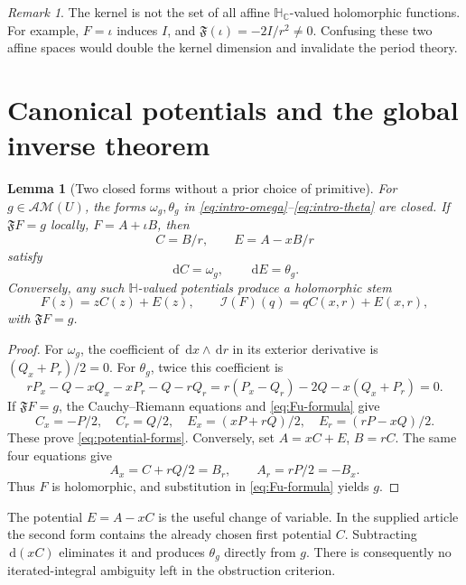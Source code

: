\documentclass[11pt,a4paper]{article}
\numberwithin{equation}{section}
\newtheorem{lemma}[theorem]{Lemma}
\theoremstyle{definition}
\theoremstyle{remark}
\newtheorem{remark}[theorem]{Remark}
\newcommand{\C}{\mathbb C}
\newcommand{\HH}{\mathbb H}
\newcommand{\HC}{\mathbb H_{\C}}
\newcommand{\Ind}{\mathcal I}
\newcommand{\Fu}{\mathfrak F}
\newcommand{\AM}{\mathcal{AM}}
\newcommand{\dd}{\,\mathrm d}
\begin{document}
\begin{remark}
The kernel is not the set of all affine $\HC$-valued holomorphic functions.
For example, $F=\iota$ induces $I$, and $\Fu(\iota)=-2I/r^2\ne0$.
Confusing these two affine spaces would double the kernel dimension and
invalidate the period theory.
\end{remark}

\section{Canonical potentials and the global inverse theorem}
\label{sec:periods}

\begin{lemma}[Two closed forms without a prior choice of primitive]
\label{lem:forms}
For $g\in\AM(U)$, the forms $\omega_g,\theta_g$ in
\eqref{eq:intro-omega}--\eqref{eq:intro-theta} are closed. If
$\Fu F=g$ locally, $F=A+\iota B$, then
\begin{equation}\label{eq:potentials}
 C=B/r,\qquad E=A-xB/r
\end{equation}
satisfy
\begin{equation}\label{eq:potential-forms}
 \dd C=\omega_g,\qquad \dd E=\theta_g.
\end{equation}
Conversely, any such $\HH$-valued potentials produce a holomorphic stem
\begin{equation}\label{eq:reconstruct}
 F(z)=zC(z)+E(z),\qquad \Ind(F)(q)=qC(x,r)+E(x,r),
\end{equation}
with $\Fu F=g$.
\end{lemma}
\begin{proof}
For $\omega_g$, the coefficient of $\dd x\wedge\dd r$ in its exterior
derivative is $(Q_x+P_r)/2=0$. For $\theta_g$, twice this coefficient is
\[
 rP_x-Q-xQ_x-xP_r-Q-rQ_r
 =r(P_x-Q_r)-2Q-x(Q_x+P_r)=0.
\]
If $\Fu F=g$, the Cauchy--Riemann equations and
\eqref{eq:Fu-formula} give
\[
 C_x=-P/2,\quad C_r=Q/2,\quad
 E_x=(xP+rQ)/2,\quad E_r=(rP-xQ)/2.
\]
These prove \eqref{eq:potential-forms}. Conversely, set $A=xC+E$,
$B=rC$. The same four equations give
\[
 A_x=C+rQ/2=B_r,\qquad A_r=rP/2=-B_x.
\]
Thus $F$ is holomorphic, and substitution in \eqref{eq:Fu-formula}
yields $g$.
\end{proof}

The potential $E=A-xC$ is the useful change of variable. In the supplied
article the second form contains the already chosen first potential $C$.
Subtracting $\dd(xC)$ eliminates it and produces $\theta_g$ directly from
$g$. There is consequently no iterated-integral ambiguity left in the
obstruction criterion.
\end{document}
